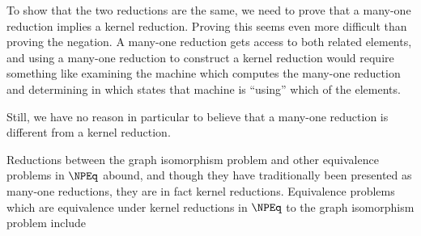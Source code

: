 \documentclass[draft]{article}
\theoremstyle{definition}
\begin{document}
To show that the two reductions are the same, we need to prove that a many-one
reduction implies a kernel reduction. Proving this seems even more difficult
than proving the negation. A many-one reduction gets access to both related
elements, and using a many-one reduction to construct a kernel reduction would
require something like examining the machine which computes the many-one
reduction and determining in which states that machine is ``using'' which of
the elements.

Still, we have no reason in particular to believe that a many-one reduction is
different from a kernel reduction. %

Reductions between the graph isomorphism problem and other equivalence problems
in $\NPEq$ abound, and though they have traditionally been presented as
many-one reductions, they are in fact kernel reductions. Equivalence problems
which are equivalence under kernel reductions in $\NPEq$ to the graph
isomorphism problem include
\begin{itemize}
  
\end{itemize}

%
\end{document}
